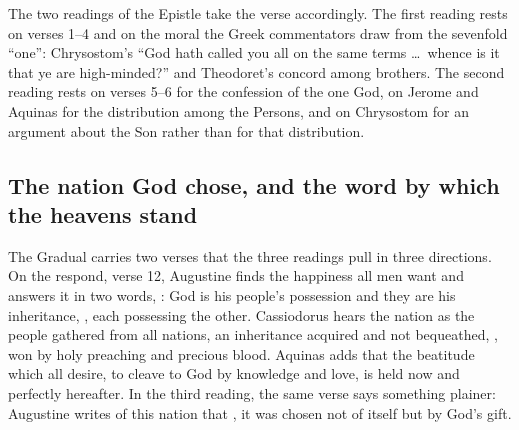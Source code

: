 The two readings of the Epistle take the verse accordingly. The first reading rests on verses 1--4 and on the moral the Greek
commentators draw from the sevenfold ``one'': Chrysostom's ``God hath called
you all on the same terms \dots\ whence is it that ye are high-minded?'' and
Theodoret's concord among brothers. The second reading rests on verses 5--6 for the confession of the one God, on Jerome and
Aquinas for the distribution among the Persons, and on Chrysostom for an
argument about the Son rather than for that distribution.

\subsection{The nation God chose, and the word by which the heavens stand}

The Gradual carries two verses that the three readings pull in three
directions. On the respond, verse 12, Augustine finds the happiness all men want and answers it in
two words, : God is his people's possession and
they are his inheritance, , each possessing the
other. Cassiodorus hears the nation as the people gathered from all nations,
an inheritance acquired and not bequeathed, , won by holy preaching and precious
blood. Aquinas adds that the beatitude which all desire, to cleave to God by
knowledge and love, is held now  and perfectly
hereafter. In the third reading, the same verse says something
plainer: Augustine writes of this nation that , it was chosen not of itself but by God's gift.

